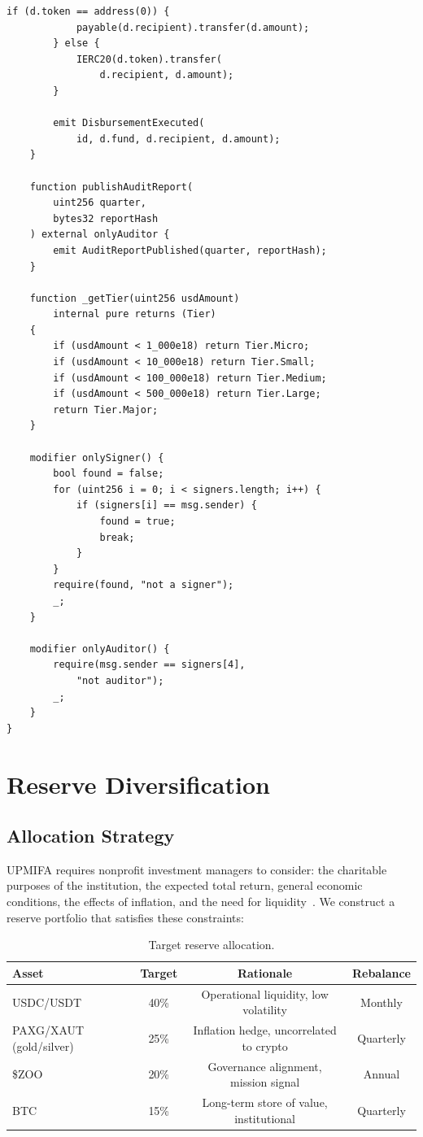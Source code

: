 \documentclass[11pt,letterpaper]{article}
\begin{document}
\begin{lstlisting}[language=Solidity,caption=TreasuryMultisig contract]
        if (d.token == address(0)) {
            payable(d.recipient).transfer(d.amount);
        } else {
            IERC20(d.token).transfer(
                d.recipient, d.amount);
        }

        emit DisbursementExecuted(
            id, d.fund, d.recipient, d.amount);
    }

    function publishAuditReport(
        uint256 quarter,
        bytes32 reportHash
    ) external onlyAuditor {
        emit AuditReportPublished(quarter, reportHash);
    }

    function _getTier(uint256 usdAmount)
        internal pure returns (Tier)
    {
        if (usdAmount < 1_000e18) return Tier.Micro;
        if (usdAmount < 10_000e18) return Tier.Small;
        if (usdAmount < 100_000e18) return Tier.Medium;
        if (usdAmount < 500_000e18) return Tier.Large;
        return Tier.Major;
    }

    modifier onlySigner() {
        bool found = false;
        for (uint256 i = 0; i < signers.length; i++) {
            if (signers[i] == msg.sender) {
                found = true;
                break;
            }
        }
        require(found, "not a signer");
        _;
    }

    modifier onlyAuditor() {
        require(msg.sender == signers[4],
            "not auditor");
        _;
    }
}
\end{lstlisting}

\section{Reserve Diversification}
\label{sec:reserves}

\subsection{Allocation Strategy}

UPMIFA requires nonprofit investment managers to consider: the charitable purposes of the institution, the expected total return, general economic conditions, the effects of inflation, and the need for liquidity~\cite{upmifa2006}. We construct a reserve portfolio that satisfies these constraints:

\begin{table}[t]
\centering
\begin{tabular}{lccc}
\toprule
\textbf{Asset} & \textbf{Target} & \textbf{Rationale} & \textbf{Rebalance} \\
\midrule
USDC/USDT & 40\% & Operational liquidity, low volatility & Monthly \\
PAXG/XAUT (gold/silver) & 25\% & Inflation hedge, uncorrelated to crypto & Quarterly \\
\$ZOO & 20\% & Governance alignment, mission signal & Annual \\
BTC & 15\% & Long-term store of value, institutional & Quarterly \\
\bottomrule
\end{tabular}
\caption{Target reserve allocation.}
\label{tab:reserves}
\end{table}
\end{document}
